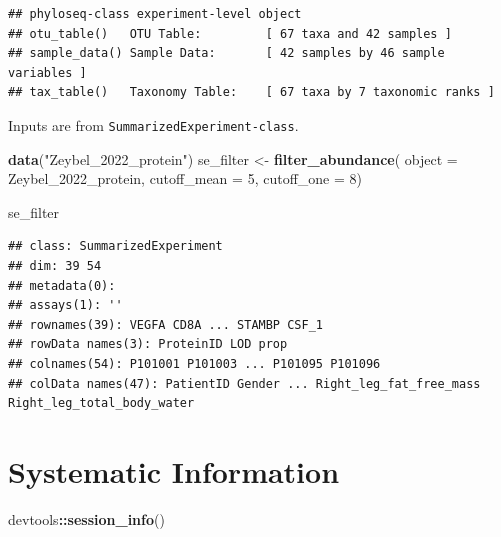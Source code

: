 \documentclass[
]{book}
\newenvironment{Shaded}{\begin{snugshade}}{\end{snugshade}}
\newcommand{\AttributeTok}[1]{\textcolor[rgb]{0.13,0.29,0.53}{#1}}
\newcommand{\DecValTok}[1]{\textcolor[rgb]{0.00,0.00,0.81}{#1}}
\newcommand{\FunctionTok}[1]{\textcolor[rgb]{0.13,0.29,0.53}{\textbf{#1}}}
\newcommand{\NormalTok}[1]{#1}
\newcommand{\OtherTok}[1]{\textcolor[rgb]{0.56,0.35,0.01}{#1}}
\newcommand{\SpecialCharTok}[1]{\textcolor[rgb]{0.81,0.36,0.00}{\textbf{#1}}}
\newcommand{\StringTok}[1]{\textcolor[rgb]{0.31,0.60,0.02}{#1}}
\begin{document}
\begin{verbatim}
## phyloseq-class experiment-level object
## otu_table()   OTU Table:         [ 67 taxa and 42 samples ]
## sample_data() Sample Data:       [ 42 samples by 46 sample variables ]
## tax_table()   Taxonomy Table:    [ 67 taxa by 7 taxonomic ranks ]
\end{verbatim}

Inputs are from \texttt{SummarizedExperiment-class}.

\begin{Shaded}
\begin{Highlighting}[]
\FunctionTok{data}\NormalTok{(}\StringTok{"Zeybel\_2022\_protein"}\NormalTok{)}
\NormalTok{se\_filter }\OtherTok{\textless{}{-}} \FunctionTok{filter\_abundance}\NormalTok{(}
  \AttributeTok{object =}\NormalTok{ Zeybel\_2022\_protein,}
  \AttributeTok{cutoff\_mean =} \DecValTok{5}\NormalTok{,}
  \AttributeTok{cutoff\_one =} \DecValTok{8}\NormalTok{)}

\NormalTok{se\_filter}
\end{Highlighting}
\end{Shaded}

\begin{verbatim}
## class: SummarizedExperiment 
## dim: 39 54 
## metadata(0):
## assays(1): ''
## rownames(39): VEGFA CD8A ... STAMBP CSF_1
## rowData names(3): ProteinID LOD prop
## colnames(54): P101001 P101003 ... P101095 P101096
## colData names(47): PatientID Gender ... Right_leg_fat_free_mass Right_leg_total_body_water
\end{verbatim}

\hypertarget{systematic-information}{%
\section{Systematic Information}\label{systematic-information}}

\begin{Shaded}
\begin{Highlighting}[]
\NormalTok{devtools}\SpecialCharTok{::}\FunctionTok{session\_info}\NormalTok{()}
\end{Highlighting}
\end{Shaded}
\end{document}
